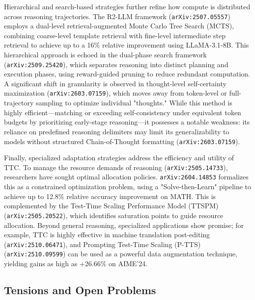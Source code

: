 \documentclass[11pt]{article}
\begin{document}
Hierarchical and search-based strategies further refine how compute is distributed across reasoning trajectories. The R2-LLM framework (\texttt{arXiv:2507.05557}) employs a dual-level retrieval-augmented Monte Carlo Tree Search (MCTS), combining coarse-level template retrieval with fine-level intermediate step retrieval to achieve up to a 16\% relative improvement using LLaMA-3.1-8B. This hierarchical approach is echoed in the dual-phase search framework (\texttt{arXiv:2509.25420}), which separates reasoning into distinct planning and execution phases, using reward-guided pruning to reduce redundant computation. A significant shift in granularity is observed in thought-level self-certainty maximization (\texttt{arXiv:2603.07159}), which moves away from token-level or full-trajectory sampling to optimize individual "thoughts." While this method is highly efficient—matching or exceeding self-consistency under equivalent token budgets by prioritizing early-stage reasoning—it possesses a notable weakness: its reliance on predefined reasoning delimiters may limit its generalizability to models without structured Chain-of-Thought formatting (\texttt{arXiv:2603.07159}).

Finally, specialized adaptation strategies address the efficiency and utility of TTC. To manage the resource demands of reasoning (\texttt{arXiv:2505.14733}), researchers have sought optimal allocation policies. \texttt{arXiv:2604.14853} formalizes this as a constrained optimization problem, using a "Solve-then-Learn" pipeline to achieve up to 12.8\% relative accuracy improvement on MATH. This is complemented by the Test-Time Scaling Performance Model (TTSPM) (\texttt{arXiv:2505.20522}), which identifies saturation points to guide resource allocation. Beyond general reasoning, specialized applications show promise; for example, TTC is highly effective in machine translation post-editing (\texttt{arXiv:2510.06471}), and Prompting Test-Time Scaling (P-TTS) (\texttt{arXiv:2510.09599}) can be used as a powerful data augmentation technique, yielding gains as high as +26.66\% on AIME'24.

\subsection{Tensions and Open Problems}
\end{document}

